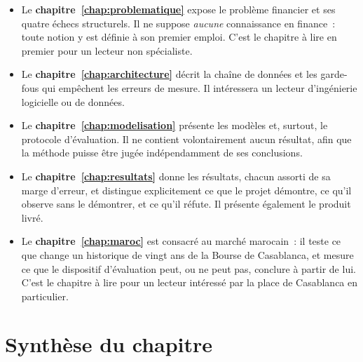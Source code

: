 \begin{itemize}
  \item Le \textbf{chapitre~\ref{chap:problematique}} expose le problème
        financier et ses quatre échecs structurels. Il ne suppose \emph{aucune}
        connaissance en finance~: toute notion y est définie à son premier
        emploi. C'est le chapitre à lire en premier pour un lecteur non
        spécialiste.
  \item Le \textbf{chapitre~\ref{chap:architecture}} décrit la chaîne de données
        et les garde-fous qui empêchent les erreurs de mesure. Il intéressera un
        lecteur d'ingénierie logicielle ou de données.
  \item Le \textbf{chapitre~\ref{chap:modelisation}} présente les modèles et,
        surtout, le protocole d'évaluation. Il ne contient volontairement aucun
        résultat, afin que la méthode puisse être jugée indépendamment de ses
        conclusions.
  \item Le \textbf{chapitre~\ref{chap:resultats}} donne les résultats, chacun
        assorti de sa marge d'erreur, et distingue explicitement ce que le projet
        démontre, ce qu'il observe sans le démontrer, et ce qu'il réfute. Il
        présente également le produit livré.
  \item Le \textbf{chapitre~\ref{chap:maroc}} est consacré au marché marocain~:
        il teste ce que change un historique de vingt ans de la Bourse de
        Casablanca, et mesure ce que le dispositif d'évaluation peut, ou ne peut
        pas, conclure à partir de lui. C'est le chapitre à lire pour un lecteur
        intéressé par la place de Casablanca en particulier.
\end{itemize}

\section*{Synthèse du chapitre}

